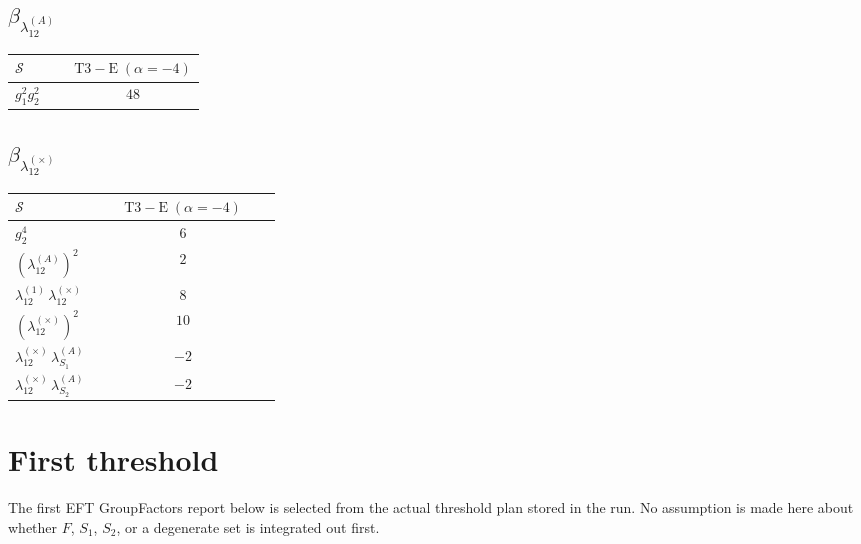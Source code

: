 \documentclass[9pt]{article}
\begin{document}
\subsection*{$ \beta_{\lambda_{12}^{(A)}} $}
\begin{longtable}{@{}p{0.31\linewidth}c@{}}
\toprule
$\mathcal{S}$ & $ \mathrm{T3-E}\;(\alpha=-4) $ \\
\midrule
$ g_1^2g_2^2 $ & $ 48 $ \\
\bottomrule
\end{longtable}
\subsection*{$ \beta_{\lambda_{12}^{(\times)}} $}
\begin{longtable}{@{}p{0.31\linewidth}c@{}}
\toprule
$\mathcal{S}$ & $ \mathrm{T3-E}\;(\alpha=-4) $ \\
\midrule
$ g_2^4 $ & $ 6 $ \\
$ \left(\lambda_{12}^{(A)}\right)^2 $ & $ 2 $ \\
$ \lambda_{12}^{(1)}\,\lambda_{12}^{(\times)} $ & $ 8 $ \\
$ \left(\lambda_{12}^{(\times)}\right)^2 $ & $ 10 $ \\
$ \lambda_{12}^{(\times)}\,\lambda_{S_1}^{(A)} $ & $ -2 $ \\
$ \lambda_{12}^{(\times)}\,\lambda_{S_2}^{(A)} $ & $ -2 $ \\
\bottomrule
\end{longtable}
\section*{First threshold}
The first EFT GroupFactors report below is selected from the actual threshold plan stored in the run.  No assumption is made here about whether $F$, $S_1$, $S_2$, or a degenerate set is integrated out first.
\end{document}
